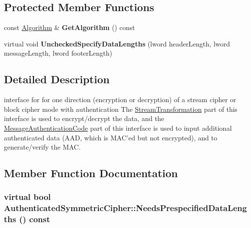 \subsection*{Protected Member Functions}
\begin{DoxyCompactItemize}
\item 
\hypertarget{class_authenticated_symmetric_cipher_a18cff87ae3712e3a70d3539ffb53500d}{
const \hyperlink{class_algorithm}{Algorithm} \& {\bfseries GetAlgorithm} () const }
\label{class_authenticated_symmetric_cipher_a18cff87ae3712e3a70d3539ffb53500d}

\item 
\hypertarget{class_authenticated_symmetric_cipher_a7e2d9de698fbb0138b1e53106ac33d25}{
virtual void {\bfseries UncheckedSpecifyDataLengths} (lword headerLength, lword messageLength, lword footerLength)}
\label{class_authenticated_symmetric_cipher_a7e2d9de698fbb0138b1e53106ac33d25}

\end{DoxyCompactItemize}


\subsection{Detailed Description}
interface for for one direction (encryption or decryption) of a stream cipher or block cipher mode with authentication The \hyperlink{class_stream_transformation}{StreamTransformation} part of this interface is used to encrypt/decrypt the data, and the \hyperlink{class_message_authentication_code}{MessageAuthenticationCode} part of this interface is used to input additional authenticated data (AAD, which is MAC'ed but not encrypted), and to generate/verify the MAC. 

\subsection{Member Function Documentation}
\hypertarget{class_authenticated_symmetric_cipher_a52595d1c7b43c7a416da2fffba46330b}{
\subsubsection[{NeedsPrespecifiedDataLengths}]{\setlength{\rightskip}{0pt plus 5cm}virtual bool AuthenticatedSymmetricCipher::NeedsPrespecifiedDataLengths () const}}
\label{class_authenticated_symmetric_cipher_a52595d1c7b43c7a416da2fffba46330b}


